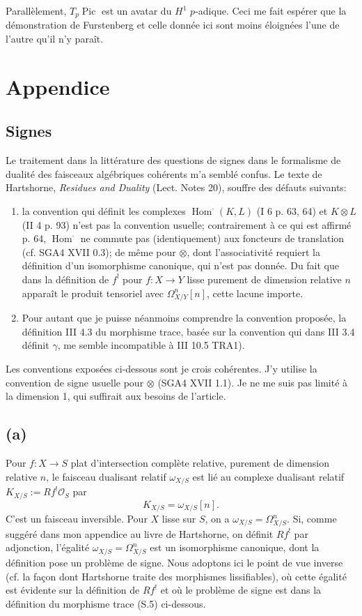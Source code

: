 \documentclass[11pt]{article}
\DeclareMathOperator{\Pic}{Pic}
\DeclareMathOperator{\Hom}{Hom}
\newcommand{\OO}{\mathcal O}
\begin{document}
Parallèlement, $T_p\Pic$ est un avatar du $H^1$ $p$-adique. Ceci me fait espérer que la démonstration de Furstenberg et celle donnée ici sont moins éloignées l'une de l'autre qu'il n'y paraît.

\appendix
\section*{Appendice}
\subsection*{Signes}

Le traitement dans la littérature des questions de signes dans le formalisme de dualité des faisceaux algébriques cohérents m'a semblé confus. Le texte de Hartshorne, \emph{Residues and Duality} (Lect. Notes 20), souffre des défauts suivants:
\begin{enumerate}[label=(\alph*)]
\item la convention qui définit les complexes $\Hom^\cdot(K,L)$ (I 6 p. 63, 64) et $K\otimes L$ (II 4 p. 93) n'est pas la convention usuelle; contrairement à ce qui est affirmé p. 64, $\Hom^\cdot$ ne commute pas (identiquement) aux foncteurs de translation (cf. SGA4 XVII 0.3); de même pour $\otimes$, dont l'associativité requiert la définition d'un isomorphisme canonique, qui n'est pas donnée. Du fait que dans la définition de $f^!$ pour $f:X\to Y$ lisse purement de dimension relative $n$ apparaît le produit tensoriel avec $\Omega^n_{X/Y}[n]$, cette lacune importe.
\item Pour autant que je puisse néanmoins comprendre la convention proposée, la définition III 4.3 du morphisme trace, basée sur la convention qui dans III 3.4 définit $\gamma$, me semble incompatible à III 10.5 TRA1).
\end{enumerate}
Les conventions exposées ci-dessous sont je crois cohérentes. J'y utilise la convention de signe usuelle pour $\otimes$ (SGA4 XVII 1.1). Je ne me suis pas limité à la dimension 1, qui suffirait aux besoins de l'article.

\subsection*{(a)}
Pour $f:X\to S$ plat d'intersection complète relative, purement de dimension relative $n$, le faisceau dualisant relatif $\omega_{X/S}$ est lié au complexe dualisant relatif $K_{X/S}:=Rf^!\OO_S$ par
\begin{equation}
        K_{X/S}=\omega_{X/S}[n]. \tag{S.1}
\end{equation}
C'est un faisceau inversible. Pour $X$ lisse sur $S$, on a $\omega_{X/S}=\Omega^n_{X/S}$. Si, comme suggéré dans mon appendice au livre de Hartshorne, on définit $Rf^!$ par adjonction, l'égalité $\omega_{X/S}=\Omega^n_{X/S}$ est un isomorphisme canonique, dont la définition pose un problème de signe. Nous adoptons ici le point de vue inverse (cf. la façon dont Hartshorne traite des morphismes lissifiables), où cette égalité est évidente sur la définition de $Rf^!$ et où le problème de signe est dans la définition du morphisme trace (S.5) ci-dessous.
\end{document}
